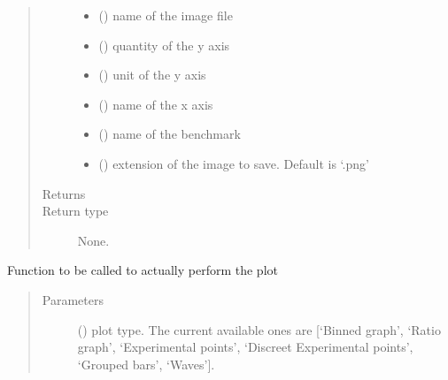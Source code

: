 \documentclass[letterpaper,10pt,english]{sphinxmanual}
\begin{document}
\begin{fulllineitems}
\begin{fulllineitems}
\begin{quote}
\begin{description}
\begin{itemize}
\item {} 
\sphinxAtStartPar
{} () \textendash{} name of the image file

\item {} 
\sphinxAtStartPar
{} () \textendash{} quantity of the y axis

\item {} 
\sphinxAtStartPar
{} () \textendash{} unit of the y axis

\item {} 
\sphinxAtStartPar
{} () \textendash{} name of the x axis

\item {} 
\sphinxAtStartPar
{} () \textendash{} name of the benchmark

\item {} 
\sphinxAtStartPar
{} () \textendash{} extension of the image to save. Default is ‘.png’

\end{itemize}

\item[{Returns}] \leavevmode
\sphinxAtStartPar


\item[{Return type}] \leavevmode
\sphinxAtStartPar
None.

\end{description}\end{quote}

\end{fulllineitems}


\begin{fulllineitems}
\label{\detokenize{api/postprocessing:plotter.Plotter.plot}}
\sphinxAtStartPar
Function to be called to actually perform the plot
\begin{quote}\begin{description}
\item[{Parameters}] \leavevmode
\sphinxAtStartPar
{} () \textendash{} plot type. The current available ones are {[}‘Binned graph’,
‘Ratio graph’, ‘Experimental points’,
‘Discreet Experimental points’, ‘Grouped bars’, ‘Waves’{]}.


\end{description}
\end{quote}
\end{fulllineitems}
\end{fulllineitems}
\end{document}

